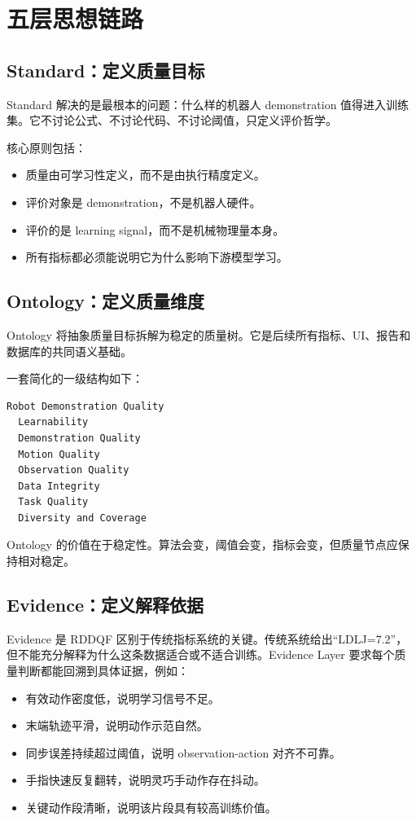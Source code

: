 \documentclass[UTF8,zihao=-4,oneside,openany]{ctexrep}
\begin{document}
\section{五层思想链路}

\subsection{Standard：定义质量目标}

Standard 解决的是最根本的问题：什么样的机器人 demonstration 值得进入训练集。它不讨论公式、不讨论代码、不讨论阈值，只定义评价哲学。

核心原则包括：

\begin{itemize}
\item 质量由可学习性定义，而不是由执行精度定义。
\item 评价对象是 demonstration，不是机器人硬件。
\item 评价的是 learning signal，而不是机械物理量本身。
\item 所有指标都必须能说明它为什么影响下游模型学习。
\end{itemize}

\subsection{Ontology：定义质量维度}

Ontology 将抽象质量目标拆解为稳定的质量树。它是后续所有指标、UI、报告和数据库的共同语义基础。

一套简化的一级结构如下：

\begin{verbatim}
Robot Demonstration Quality
  Learnability
  Demonstration Quality
  Motion Quality
  Observation Quality
  Data Integrity
  Task Quality
  Diversity and Coverage
\end{verbatim}

Ontology 的价值在于稳定性。算法会变，阈值会变，指标会变，但质量节点应保持相对稳定。

\subsection{Evidence：定义解释依据}

Evidence 是 RDDQF 区别于传统指标系统的关键。传统系统给出“LDLJ=7.2”，但不能充分解释为什么这条数据适合或不适合训练。Evidence Layer 要求每个质量判断都能回溯到具体证据，例如：

\begin{itemize}
\item 有效动作密度低，说明学习信号不足。
\item 末端轨迹平滑，说明动作示范自然。
\item 同步误差持续超过阈值，说明 observation-action 对齐不可靠。
\item 手指快速反复翻转，说明灵巧手动作存在抖动。
\item 关键动作段清晰，说明该片段具有较高训练价值。
\end{itemize}
\end{document}

